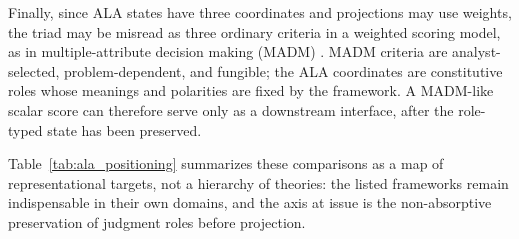 \documentclass[reqno,final]{amsart}
\theoremstyle{definition}
\theoremstyle{plain}
\theoremstyle{remark}
\begin{document}
Finally, since ALA states have three coordinates and projections may use weights, the triad may be misread as three ordinary criteria in a weighted scoring model, as in multiple-attribute decision making (MADM) \cite{HwangYoon1981,Triantaphyllou2000}. MADM criteria are analyst-selected, problem-dependent, and fungible; the ALA coordinates are constitutive roles whose meanings and polarities are fixed by the framework. A MADM-like scalar score can therefore serve only as a downstream interface, after the role-typed state has been preserved.

Table~\ref{tab:ala_positioning} summarizes these comparisons as a map of representational targets, not a hierarchy of theories: the listed frameworks remain indispensable in their own domains, and the axis at issue is the non-absorptive preservation of judgment roles before projection.
\end{document}
